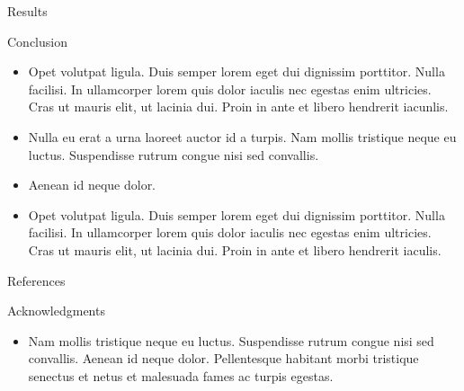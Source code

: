 \documentclass[final,hyperref={pdfpagelabels=false}]{beamer}
\begin{document}
\begin{frame}[t]
\begin{columns}[t]
\begin{column}{.465\textwidth}
\begin{block}{Results}
	
     
\end{block}




\begin{block}{Conclusion}

\begin{itemize}
\item Opet volutpat ligula. Duis semper lorem eget dui dignissim porttitor. Nulla facilisi. In ullamcorper lorem quis dolor iaculis nec egestas enim ultricies. Cras ut mauris elit, ut lacinia dui. Proin in ante et libero hendrerit iacunlis.
\item Nulla eu erat a urna laoreet auctor id a turpis. Nam mollis tristique neque eu luctus. Suspendisse rutrum congue nisi sed convallis. 
\item Aenean id neque dolor.
\item Opet volutpat ligula. Duis semper lorem eget dui dignissim porttitor. Nulla facilisi. In ullamcorper lorem quis dolor iaculis nec egestas enim ultricies. Cras ut mauris elit, ut lacinia dui. Proin in ante et libero hendrerit iaculis.
\end{itemize}

\end{block}


\begin{block}{References}
        
\nocite{*} %
\small{
}

\end{block}


\begin{block}{Acknowledgments}

\begin{itemize}
\item Nam mollis tristique neque eu luctus. Suspendisse rutrum congue nisi sed convallis. Aenean id neque dolor. Pellentesque habitant morbi tristique senectus et netus et malesuada fames ac turpis egestas.
\end{itemize}


\end{block}
\end{column}
\end{columns}
\end{frame}
\end{document}
